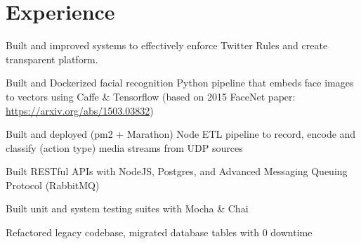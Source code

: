 \documentclass[]{deedy-resume-openfont}
\begin{document}
\hfill
\begin{minipage}[t]{0.63\textwidth} 


\section{Experience}

\vspace{\topsep} %


\vspace{\topsep} %
\vspace{\topsep} %

\begin{tightemize}
\item Built and improved systems to effectively enforce Twitter Rules and create transparent platform. 
\end{tightemize}
\sectionsep


\vspace{\topsep} %
\begin{tightemize}
\item Built and Dockerized facial recognition Python pipeline that embeds face images to vectors using Caffe \& Tensorflow (based on 2015 FaceNet paper: \href{https://arxiv.org/abs/1503.03832}{https://arxiv.org/abs/1503.03832})   
\item Built and deployed (pm2 + Marathon) Node ETL pipeline to record, encode and classify (action type) media streams from UDP sources
\item Built RESTful APIs with NodeJS, Postgres, and Advanced Messaging Queuing Protocol (RabbitMQ) 
\item Built unit and system testing suites with Mocha \& Chai 
\item Refactored legacy codebase, migrated database tables with 0 downtime
\end{tightemize}
\sectionsep



\end{minipage}
\end{document}

